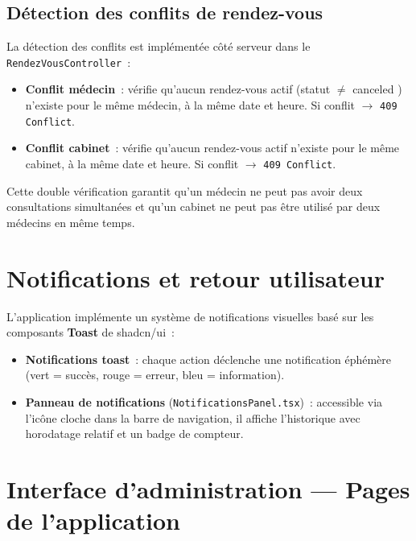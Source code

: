 \subsection{Détection des conflits de rendez-vous}

La détection des conflits est implémentée côté serveur dans le \texttt{RendezVousController}~:

\begin{itemize}
    \item \textbf{Conflit médecin}~: vérifie qu'aucun rendez-vous actif (statut $\neq$ \og canceled \fg) n'existe pour le même médecin, à la même date et heure. Si conflit $\rightarrow$ \texttt{409 Conflict}.
    \item \textbf{Conflit cabinet}~: vérifie qu'aucun rendez-vous actif n'existe pour le même cabinet, à la même date et heure. Si conflit $\rightarrow$ \texttt{409 Conflict}.
\end{itemize}

Cette double vérification garantit qu'un médecin ne peut pas avoir deux consultations simultanées et qu'un cabinet ne peut pas être utilisé par deux médecins en même temps.

\section{Notifications et retour utilisateur}

L'application implémente un système de notifications visuelles basé sur les composants \textbf{Toast} de shadcn/ui~:

\begin{itemize}
    \item \textbf{Notifications toast}~: chaque action déclenche une notification éphémère (vert = succès, rouge = erreur, bleu = information).
    \item \textbf{Panneau de notifications} (\texttt{NotificationsPanel.tsx})~: accessible via l'icône cloche dans la barre de navigation, il affiche l'historique avec horodatage relatif et un badge de compteur.
\end{itemize}

\section{Interface d'administration --- Pages de l'application}

